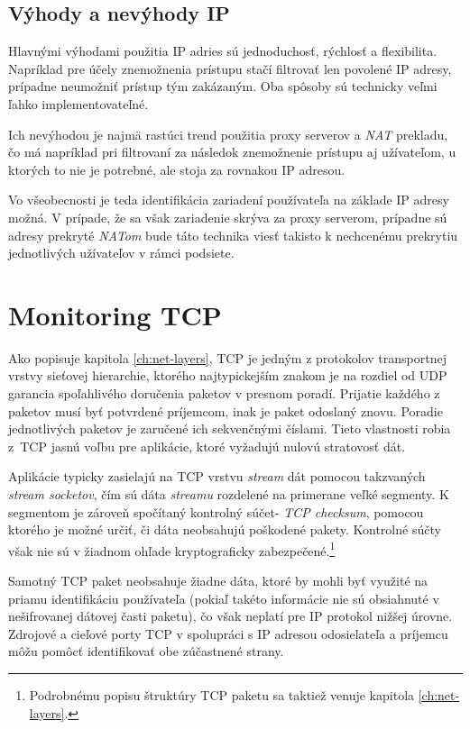 \documentclass[
  digital, %
  table,   %
  lof,     %
  nolot,   %
  nocover
]{fithesis3}
\begin{document}
\subsection{Výhody a nevýhody IP}
Hlavnými výhodami použitia IP adries sú jednoduchosť, rýchlosť a flexibilita.
Napríklad pre účely znemožnenia prístupu stačí filtrovať len povolené IP
adresy, prípadne neumožniť prístup tým zakázaným. Oba spôsoby sú technicky veľmi
ľahko implementovateľné.

Ich nevýhodou je najmä rastúci trend použitia proxy serverov a \textit{NAT}
prekladu, čo má napríklad pri filtrovaní za následok znemožnenie prístupu aj
užívateľom, u ktorých to nie je potrebné, ale stoja za rovnakou IP adresou.

Vo všeobecnosti je teda identifikácia zariadení používateľa na základe IP
adresy možná. V prípade, že sa však zariadenie skrýva za proxy serverom,
prípadne sú adresy prekryté \textit{NATom} bude táto technika viesť takisto k
nechcenému prekrytiu jednotlivých užívateľov v rámci podsiete.

\section{Monitoring TCP}
Ako popisuje kapitola \ref{ch:net-layers}, TCP
je jedným z protokolov transportnej
vrstvy sieťovej hierarchie, ktorého najtypickejším znakom je na rozdiel
od UDP garancia spoľahlivého doručenia paketov v presnom poradí. Prijatie
každého z paketov musí byť potvrdené príjemcom, inak je paket odoslaný znovu.
Poradie jednotlivých paketov je zaručené ich sekvenčnými číslami. Tieto 
vlastnosti robia z~TCP jasnú voľbu pre aplikácie, ktoré vyžadujú nulovú
stratovosť dát. 

Aplikácie typicky zasielajú na TCP vrstvu \textit{stream} dát
pomocou takzvaných \textit{stream socketov}, čím sú dáta \textit{streamu}
rozdelené na primerane veľké segmenty. K segmentom je zároveň spočítaný
kontrolný súčet- \textit{TCP checksum}, pomocou ktorého je možné určiť, či
dáta neobsahujú poškodené pakety. Kontrolné súčty však nie sú v žiadnom ohľade
kryptograficky zabezpečené.\footnote{Podrobnému popisu štruktúry TCP paketu sa
taktiež venuje kapitola \ref{ch:net-layers}.}

Samotný TCP paket neobsahuje žiadne dáta, ktoré by mohli byť využité na priamu
identifikáciu používateľa (pokiaľ takéto informácie nie sú obsiahnuté v
nešifrovanej dátovej časti paketu), čo však neplatí pre IP protokol nižšej
úrovne. Zdrojové a cieľové porty TCP v spolupráci s IP adresou odosielateľa a
príjemcu môžu pomôcť identifikovať obe zúčastnené strany.
\end{document}

